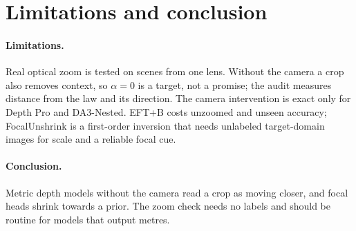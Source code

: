 \section{Limitations and conclusion}
\label{sec:conclusion}

\paragraph{Limitations.}
Real optical zoom is tested on \srrawSequences{} scenes from one lens. Without the camera a crop also removes
context, so $\alpha=0$ is a target, not a promise; the audit measures distance from the law and its direction. The camera intervention is exact only for Depth Pro and
DA3-Nested. EFT+B costs unzoomed and unseen accuracy; FocalUnshrink is a first-order inversion that needs unlabeled target-domain images for scale and a reliable focal cue.

\paragraph{Conclusion.}
Metric depth models without the camera read a crop as moving closer, and focal heads shrink towards a prior. The
zoom check needs no labels and should be routine for models that output metres.
